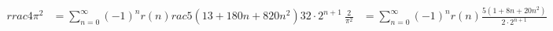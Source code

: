 \documentclass[preview]{standalone}
\begin{document}
\begin{align*}
rrac{4}{\pi^2} &= \sum_{n=0}^{\infty} (-1)^n r(n) rac{5(13 + 180n + 820n^2)}{32 \cdot 2^{n+1}} \
\frac{2}{\pi^2} &= \sum_{n=0}^{\infty} (-1)^n r(n) \frac{5(1 + 8n + 20n^2)}{2 \cdot 2^{n+1}}
\end{align*}
\end{document}
